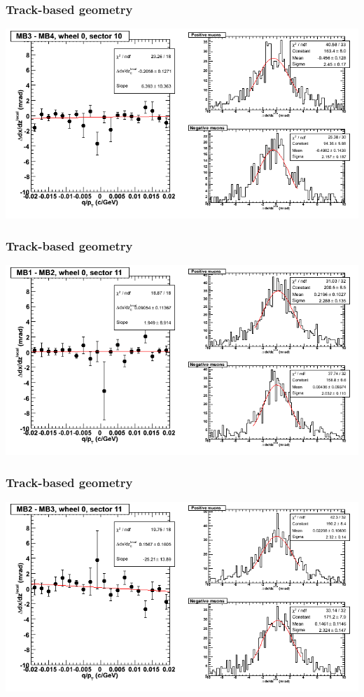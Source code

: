\documentclass[compress]{beamer}
\begin{document}
\begin{frame}
\frametitle{Track-based geometry}
\includegraphics[width=\linewidth]{NOV4_segdiffs/dt13_slope_C_10_34.png}
\end{frame}

\begin{frame}
\frametitle{Track-based geometry}
\includegraphics[width=\linewidth]{NOV4_segdiffs/dt13_slope_C_11_12.png}
\end{frame}

\begin{frame}
\frametitle{Track-based geometry}
\includegraphics[width=\linewidth]{NOV4_segdiffs/dt13_slope_C_11_23.png}
\end{frame}
\end{document}
